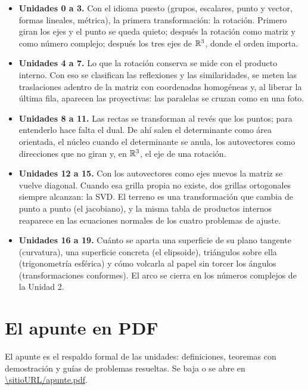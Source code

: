 \documentclass[11pt,a4paper]{report}
\begin{document}
\begin{itemize}
  \item \textbf{Unidades 0 a 3.} Con el idioma puesto (grupos, escalares, punto y vector, formas lineales, métrica), la primera transformación: la rotación. Primero giran los ejes y el punto se queda quieto; después la rotación como matriz y como número complejo; después los tres ejes de \(\mathbb{R}^3\), donde el orden importa.
  \item \textbf{Unidades 4 a 7.} Lo que la rotación conserva se mide con el producto interno. Con eso se clasifican las reflexiones y las similaridades, se meten las traslaciones adentro de la matriz con coordenadas homogéneas y, al liberar la última fila, aparecen las proyectivas: las paralelas se cruzan como en una foto.
  \item \textbf{Unidades 8 a 11.} Las rectas se transforman al revés que los puntos; para entenderlo hace falta el dual. De ahí salen el determinante como área orientada, el núcleo cuando el determinante se anula, los autovectores como direcciones que no giran y, en \(\mathbb{R}^3\), el eje de una rotación.
  \item \textbf{Unidades 12 a 15.} Con los autovectores como ejes nuevos la matriz se vuelve diagonal. Cuando esa grilla propia no existe, dos grillas ortogonales siempre alcanzan: la SVD. El terreno es una transformación que cambia de punto a punto (el jacobiano), y la misma tabla de productos internos reaparece en las ecuaciones normales de los cuatro problemas de ajuste.
  \item \textbf{Unidades 16 a 19.} Cuánto se aparta una superficie de su plano tangente (curvatura), una superficie concreta (el elipsoide), triángulos sobre ella (trigonometría esférica) y cómo volcarla al papel sin torcer los ángulos (transformaciones conformes). El arco se cierra en los números complejos de la Unidad 2.
\end{itemize}

\section{El apunte en PDF}\label{sec:apunte}

El apunte es el respaldo formal de las unidades: definiciones, teoremas con demostración y guías de problemas resueltas. Se baja o se abre en \url{\sitioURL/apunte.pdf}.
\end{document}
